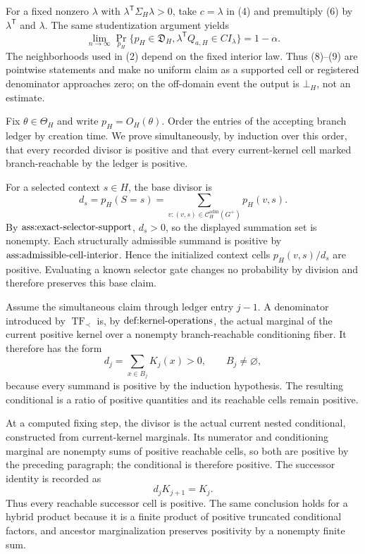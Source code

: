 For a fixed nonzero \(\lambda\) with \(\lambda^{\mathsf T}\Sigma_H\lambda>0\), take \(c=\lambda\) in (4) and premultiply (6) by \(\lambda^{\mathsf T}\) and \(\lambda\).  The same studentization argument yields
\[
 \lim_{n\to\infty}
 \Pr_{p_H}\{\widehat p_H\in\mathfrak D_H,
 \lambda^{\mathsf T}Q_{a,H}\in CI_{\lambda}\}=1-\alpha.
\tag{9}
\]
The neighborhoods used in (2) depend on the fixed interior law.  Thus (8)--(9) are pointwise statements and make no uniform claim as a supported cell or registered denominator approaches zero; on the off-domain event the output is \(\bot_H\), not an estimate.

Fix \(\theta\in\Theta_H\) and write \(p_H=O_H(\theta)\).  Order the entries of the accepting branch ledger by creation time.  We prove simultaneously, by induction over this order, that every recorded divisor is positive and that every current-kernel cell marked branch-reachable by the ledger is positive.

For a selected context \(s\in H\), the base divisor is
\[
 d_s=p_H(S=s)=
 \sum_{v:(v,s)\in\mathcal C_H^{\mathrm{adm}}(G^+)}p_H(v,s).
\tag{1}
\]
By \(\textnormal{ass:exact-selector-support}\), \(d_s>0\), so the displayed summation set is nonempty.  Each structurally admissible summand is positive by \(\textnormal{ass:admissible-cell-interior}\).  Hence the initialized context cells \(p_H(v,s)/d_s\) are positive.  Evaluating a known selector gate changes no probability by division and therefore preserves this base claim.

Assume the simultaneous claim through ledger entry \(j-1\).  A denominator introduced by \(\operatorname{TF}_{\prec}\) is, by \(\textnormal{def:kernel-operations}\), the actual marginal of the current positive kernel over a nonempty branch-reachable conditioning fiber.  It therefore has the form
\[
 d_j=\sum_{x\in B_j}K_j(x)>0,
 \qquad B_j\ne\varnothing,
\tag{2}
\]
because every summand is positive by the induction hypothesis.  The resulting conditional is a ratio of positive quantities and its reachable cells remain positive.

At a computed fixing step, the divisor is the actual current nested conditional, constructed from current-kernel marginals.  Its numerator and conditioning marginal are nonempty sums of positive reachable cells, so both are positive by the preceding paragraph; the conditional is therefore positive.  The successor identity is recorded as
\[
 d_jK_{j+1}=K_j.
\tag{3}
\]
Thus every reachable successor cell is positive.  The same conclusion holds for a hybrid product because it is a finite product of positive truncated conditional factors, and ancestor marginalization preserves positivity by a nonempty finite sum.

